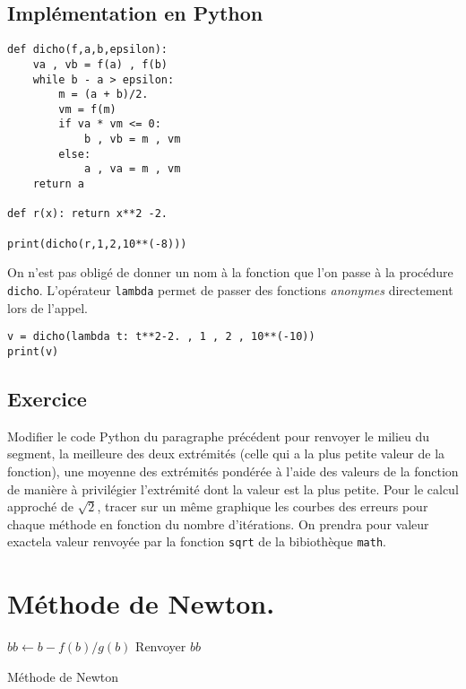 \subsection{Implémentation en Python}
\begin{verbatim}
def dicho(f,a,b,epsilon):
    va , vb = f(a) , f(b)
    while b - a > epsilon:
        m = (a + b)/2.
        vm = f(m)
        if va * vm <= 0:
            b , vb = m , vm
        else:
            a , va = m , vm
    return a
    
def r(x): return x**2 -2.
    
print(dicho(r,1,2,10**(-8)))  
\end{verbatim}
On n'est pas obligé de donner un nom à la fonction que l'on passe à la procédure \verb|dicho|. L'opérateur \verb|lambda| permet de passer des fonctions \emph{anonymes} directement lors de l'appel.
\begin{verbatim}
v = dicho(lambda t: t**2-2. , 1 , 2 , 10**(-10))
print(v)
\end{verbatim}

\subsection{Exercice}
Modifier le code Python du paragraphe précédent pour renvoyer le milieu du segment, la meilleure des deux extrémités (celle qui a la plus petite valeur de la fonction), une moyenne des extrémités pondérée à l'aide des valeurs de la fonction de manière à privilégier l'extrémité dont la valeur est la plus petite.\newline
Pour le calcul approché de $\sqrt{2}$, tracer sur un même graphique les courbes des erreurs pour chaque méthode en fonction du nombre d'itérations. On prendra pour valeur \og exacte\fg la valeur renvoyée par la fonction \verb|sqrt| de la bibiothèque \verb|math|.

\section{Méthode de Newton.}
\begin{algorithm}
  $bb \leftarrow b - f(b)/g(b)$\;  
  Renvoyer $bb$\;
  \caption{Méthode de Newton}
  \label{resolnumequ_2}
\end{algorithm}

